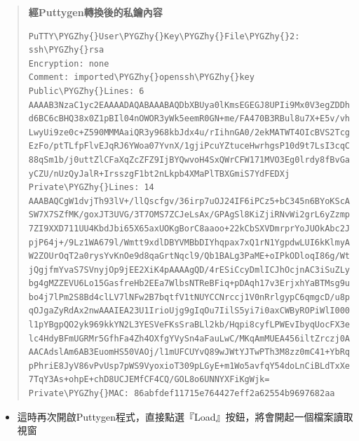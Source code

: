 \documentclass[letterpaper,10pt,english]{sphinxmanual}
\def\PYGZhy{\char`\-}
\begin{document}
\begin{quote}
\textbf{經Puttygen轉換後的私鑰內容}

\begin{Verbatim}[commandchars=\\\{\}]
PuTTY\PYGZhy{}User\PYGZhy{}Key\PYGZhy{}File\PYGZhy{}2: ssh\PYGZhy{}rsa
Encryption: none
Comment: imported\PYGZhy{}openssh\PYGZhy{}key
Public\PYGZhy{}Lines: 6
AAAAB3NzaC1yc2EAAAADAQABAAABAQDbXBUya0lKmsEGEGJ8UPIi9Mx0V3egZDDh
d6BC6cBHQ38x0Z1pBIl04nOWOR3yWk5eemR0GN+me/FA470B3RBul8u7X+E5v/vh
LwyUi9ze0c+Z590MMMAaiQR3y968kbJdx4u/rIihnGA0/2ekMATWT4OIcBVS2Tcg
EzFo/ptTLfpFlvEJqRJ6YWoa07YvnX/1gjiPcuYZtuceHwrhgsP10d9t7LsI3cqC
88qSm1b/j0uttZlCFaXqZcZFZ9IjBYQwvoH4SxQWrCFW171MVO3Eg0lrdy8fBvGa
yCZU/nUzQyJalR+IrsszgF1bt2nLkpb4XMaPlTBXGmiS7YdFEDXj
Private\PYGZhy{}Lines: 14
AAABAQCgW1dvjTh93lV+/llQscfgv/36irp7uOJ24IF6iPCz5+bC345n6BYoKScA
SW7X7SZfMK/goxJT3UVG/3T7OMS7ZCJeLsAx/GPAgSl8KiZjiRNvWi2grL6yZzmp
7ZI9XXD711UU4KbdJbi65X65axUOKgBorC8aaoo+22kCbSXVDmrprYoJUOkAbc2J
pjP64j+/9Lz1WA679l/Wmtt9xdlDBYVMBbDIYhqpax7xQ1rN1YgpdwLUI6kKlmyA
W2ZOUrOqT2a0rysYvKnOe9d8qaGrtNqcl9/Qb1BALg3PaME+oIPkODloqI86g/Wt
jQgjfmYvaS7SVnyjOp9jEE2XiK4pAAAAgQD/4rESiCcyDmlICJhOcjnAC3iSuZLy
bg4gMZZEVU6Lo15GasfreHb2EEa7WlbsNTReBFiq+pDAqh17v3ErjxhYaBTMsg9u
bo4j7lPm2S8Bd4clLV7lNFw2B7bqtfV1tNUYCCNrccj1V0nRrlgypC6qmgcD/u8p
qOJgaZyRdAx2nwAAAIEA23U1IrioUjg9gIqOu7IilS5yi7i0axCWByROPiWlI000
l1pYBgpQO2yk969kkYN2L3YESVeFKsSraBLl2kb/Hqpi8cyfLPWEvIbyqUocFX3e
lc4HdyBFmUGRMr5GfhFa4Zh4OXfgYVySn4aFauLwC/MKqAmMUEA456iltZrczj0A
AACAdslAm6AB3EuomHS50VAOj/l1mUFCUYvQ89wJWtYJTwPTh3M8zz0mC41+YbRq
pPhriE8JyV86vPvUsp7pWS9VyoxioT309pLGyE+m1Wo5avfqY54doLnCiBLdTxXe
7TqY3As+ohpE+chD8UCJEMfCF4CQ/GOL8o6UNNYXFiKgWjk=
Private\PYGZhy{}MAC: 86abfdef11715e764427eff2a62554b9697682aa
\end{Verbatim}
\end{quote}
\begin{itemize}
\item {} 
這時再次開啟Puttygen程式，直接點選『Load』按鈕，將會開起一個檔案讀取視窗

\end{itemize}
\end{document}
